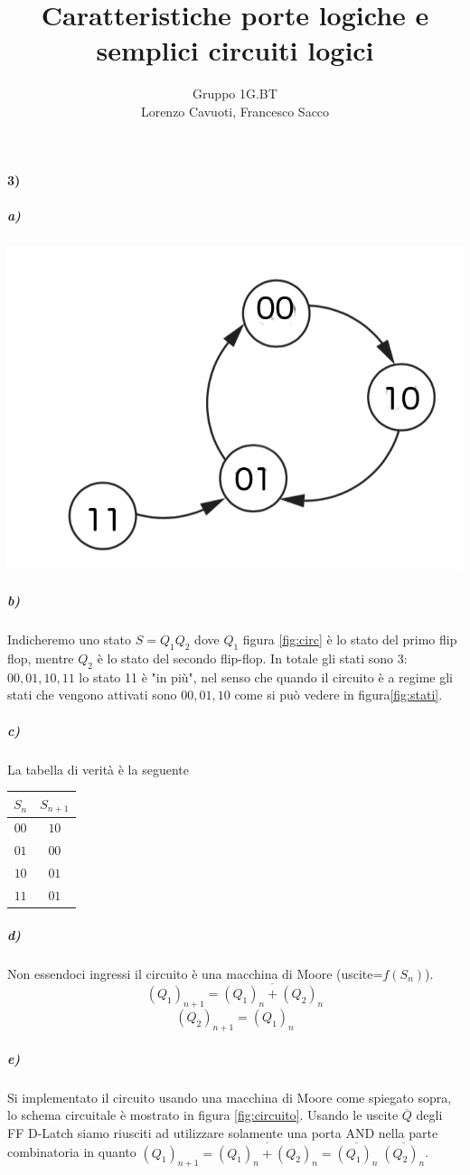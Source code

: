 \documentclass{article}
\date{}
\author{Gruppo 1G.BT \\Lorenzo Cavuoti, Francesco Sacco}
\title{Caratteristiche porte logiche e semplici circuiti logici}
\begin{document}
\maketitle
\paragraph{3)}
	\subparagraph{a)}
		\begin{center}
			\begin{minipage}{.7\linewidth}
				\includegraphics[width=0.5\linewidth]{foto/diagramma_a_stati}
				\label{fig:stati}
			\end{minipage}
		\end{center}
	\subparagraph{b)}
		Indicheremo uno stato $S=Q_1Q_2$ dove $Q_1$ figura \ref{fig:circ} è lo stato del primo flip flop, mentre $Q_2$ è lo stato del secondo flip-flop.\newline
		In totale gli stati sono 3: $00, 01, 10, 11$ lo stato 11 è "in più", nel senso che quando il circuito è a regime gli stati che vengono attivati sono $00,01,10$ come si può vedere in figura\ref{fig:stati}.
	\subparagraph{c)}
		La tabella di verità è la seguente\newline
		\begin{center}
		\begin{tabular}{cc}
			\hline
			$S_n$ & $S_{n+1}$\\
			\hline
			$00$ & $10$\\
			$01$ & $00$\\
			$10$ & $01$\\
			$11$ & $01$\\
			\hline
		\end{tabular}
		\end{center}
	\subparagraph{d)}
		Non essendoci ingressi il circuito è una macchina di Moore (uscite=$f(S_n)$).\newline
		\[
			(Q_1)_{n+1}=\overline{(Q_1)_n+(Q_2)_n}
		\]
		\[
			(Q_2)_{n+1}=(Q_1)_n
		\]
	\subparagraph{e)}
		Si implementato il circuito usando una macchina di Moore come spiegato sopra, lo schema circuitale è mostrato in figura \ref{fig:circuito}. Usando le uscite $\overline{Q}$ degli FF D-Latch siamo riusciti ad utilizzare solamente una porta AND nella parte combinatoria in quanto $(Q_1)_{n+1}=\overline{(Q_1)_n+(Q_2)_n} = \overline{(Q_1)_n} \; \overline{(Q_2)_n}$.
		
\end{document}
